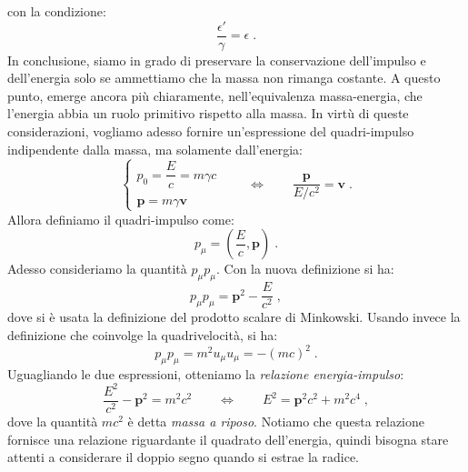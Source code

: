 con la condizione:
\begin{equation}
\frac{\epsilon'}{\gamma}=\epsilon\;.
\end{equation}
In conclusione, siamo in grado di preservare la conservazione dell'impulso e dell'energia solo se ammettiamo che la massa non rimanga 
costante. A questo punto, emerge ancora più chiaramente, nell'equivalenza massa-energia, che l'energia abbia un ruolo primitivo rispetto 
alla massa. In virtù di queste considerazioni, vogliamo adesso fornire un'espressione del quadri-impulso indipendente dalla massa, ma 
solamente dall'energia:
\begin{equation}
 \begin{cases}
  p_0=\dfrac{E}{c}=m\gamma c \\
\\
\mathbf{p}=m\gamma\mathbf{v}
 \end{cases}\qquad \Longleftrightarrow\qquad 
\frac{\mathbf{p}}{E/c^2}=\mathbf{v}\;.
\end{equation}
Allora definiamo il quadri-impulso come:
\begin{equation}
 p_{\mu}=\left(\frac{E}{c},\mathbf{p}\right)\;.
\end{equation}
Adesso consideriamo la quantità $p_{\mu}p_{\mu}$. Con la nuova definizione si ha:
\begin{equation*}
 p_{\mu}p_{\mu}=\mathbf{p}^2-\frac{E}{c^2}\;,
\end{equation*}
dove si è usata la definizione del prodotto scalare di Minkowski. Usando invece la definizione che coinvolge la quadrivelocità, si ha:
\begin{equation}
p_{\mu}p_{\mu}=m^2u_{\mu}u_{\mu}=-(mc)^2\;.
\end{equation}
Uguagliando le due espressioni, otteniamo la \textit{relazione energia-impulso}:
\begin{equation}
 \frac{E^2}{c^2}-\mathbf{p}^2=m^2c^2\qquad  \Longleftrightarrow \qquad E^2=\mathbf{p}^2c^2+m^2c^4\;,
\end{equation}
dove la quantità $mc^2$ è detta \textit{massa a riposo}. Notiamo che questa relazione fornisce una relazione riguardante il quadrato 
dell'energia, quindi bisogna stare attenti a considerare il doppio segno quando si estrae la radice.
